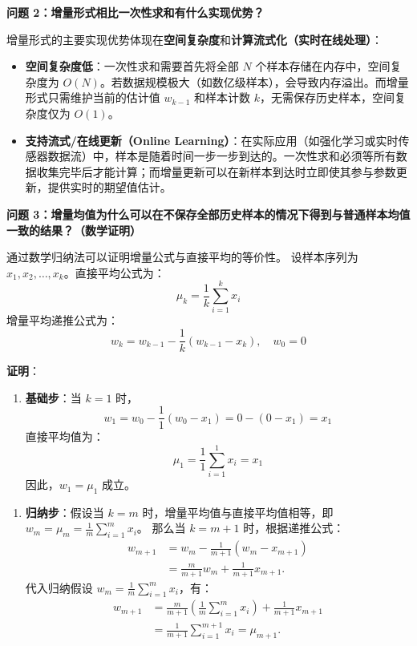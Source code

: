 \documentclass[11pt,a4paper,UTF8]{ctexart}
\numberwithin{figure}{section}
\numberwithin{table}{section}
\newcommand{\answerlabel}{%
  \par\smallskip\noindent{\heiti\bfseries 回答：}\quad}
\begin{document}
\textbf{问题 2：增量形式相比一次性求和有什么实现优势？}


\answerlabel 增量形式的主要实现优势体现在\textbf{空间复杂度}和\textbf{计算流式化（实时在线处理）}：
\begin{itemize}
\item \textbf{空间复杂度低}：一次性求和需要首先将全部 $N$ 个样本存储在内存中，空间复杂度为 $O(N)$。若数据规模极大（如数亿级样本），会导致内存溢出。而增量形式只需维护当前的估计值 $w_{k-1}$ 和样本计数 $k$，无需保存历史样本，空间复杂度仅为 $O(1)$。
\item \textbf{支持流式/在线更新（Online Learning）}：在实际应用（如强化学习或实时传感器数据流）中，样本是随着时间一步一步到达的。一次性求和必须等所有数据收集完毕后才能计算；而增量更新可以在新样本到达时立即使其参与参数更新，提供实时的期望值估计。
\end{itemize}


\textbf{问题 3：增量均值为什么可以在不保存全部历史样本的情况下得到与普通样本均值一致的结果？（数学证明）}


\answerlabel

通过数学归纳法可以证明增量公式与直接平均的等价性。
设样本序列为 $x_1, x_2, \dots, x_k$。直接平均公式为：
$$\mu_k = \frac{1}{k} \sum_{i=1}^k x_i$$
增量平均递推公式为：
$$w_k = w_{k-1} - \frac{1}{k}(w_{k-1} - x_k), \quad w_0 = 0$$

\textbf{证明}：
\begin{enumerate}
\item \textbf{基础步}：当 $k = 1$ 时，
   $$w_1 = w_0 - \frac{1}{1}(w_0 - x_1) = 0 - (0 - x_1) = x_1$$
   直接平均值为：
   $$\mu_1 = \frac{1}{1} \sum_{i=1}^1 x_i = x_1$$
   因此，$w_1 = \mu_1$ 成立。
\end{enumerate}

\begin{enumerate}
\item \textbf{归纳步}：假设当 $k = m$ 时，增量平均值与直接平均值相等，即 $w_m = \mu_m = \frac{1}{m} \sum_{i=1}^m x_i$。
   那么当 $k = m + 1$ 时，根据递推公式：
   \[
   \begin{aligned}
   w_{m+1}
   &=w_m-\frac{1}{m+1}(w_m-x_{m+1})\\
   &=\frac{m}{m+1}w_m+\frac{1}{m+1}x_{m+1}.
   \end{aligned}
   \]
   代入归纳假设 $w_m = \frac{1}{m} \sum_{i=1}^m x_i$，有：
   \[
   \begin{aligned}
   w_{m+1}
   &=\frac{m}{m+1}\left(\frac{1}{m}\sum_{i=1}^{m}x_i\right)
     +\frac{1}{m+1}x_{m+1}\\
   &=\frac{1}{m+1}\sum_{i=1}^{m+1}x_i
    =\mu_{m+1}.
   \end{aligned}
   \]
\end{enumerate}
\end{document}
